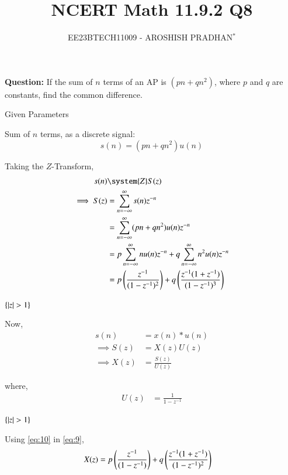 \documentclass[journal,12pt,twocolumn]{IEEEtran}
\theoremstyle{remark}
\begin{document}

\vspace{3cm}

\title{NCERT Math 11.9.2 Q8}
\author{EE23BTECH11009 - AROSHISH PRADHAN$^{*}$%
}
\maketitle
\newpage
\bigskip
\textbf{Question:} If the sum of $n$ terms of an AP is $(pn + qn^2)$, where $p$ and $q$ are constants, find the common difference.\\

\solution
\begin{table}[!h]
    \centering
    
    \caption{Given Parameters}
    \label{tab:1}
\end{table}

Sum of $n$ terms, as a discrete signal:
\begin{equation}
    s(n) = (pn + qn^2)u(n)
\end{equation}

Taking the $Z$-Transform,
\begin{align}
    s(n) &\system{Z} S(z)\\
    \implies S(z) &= \sum_{n = - \infty}^{\infty}s(n)z^{-n}\\
    &= \sum_{n = - \infty}^{\infty}(pn + qn^2)u(n)z^{-n}\\
    &= p\sum_{n = -\infty}^{\infty}nu(n)z^{-n} + q\sum_{n = -\infty}^{\infty}n^2u(n)z^{-n}\\
      &= p\brak{\frac{z^{-1}}{(1-z^{-1})^2}} + q\brak{\frac{z^{-1}(1 + z^{-1})}{(1-z^{-1})^3}}
\end{align}

$\{\left\vert z\right\vert > 1\}$

Now, 
\begin{align}
    s(n) &= x(n) \ast u(n)\\
    \implies S(z) &= X(z)U(z)\\
    \implies X(z) &= \frac{S(z)}{U(z)}\label{eq:9}
\end{align}

where,
\begin{align}
    U(z) &= \frac{1}{1 - z^{-1}}\label{eq:10}
\end{align}

$\{\left\vert z\right\vert > 1\}$

Using \eqref{eq:10} in \eqref{eq:9},
\begin{align}
    X(z) &= p\left(\frac{z^{-1}}{(1-z^{-1})}\right) + q\left(\frac{z^{-1}(1 + z^{-1})}{(1-z^{-1})^2}\right)
\end{align}
\end{document}
